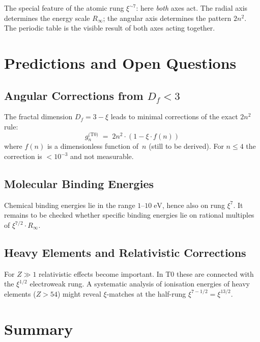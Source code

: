 \vspace{0.5em}

The special feature of the atomic rung $\xi^{\sim 7}$: here \emph{both} axes
act. The radial axis determines the energy scale $R_\infty$; the angular axis
determines the pattern $2n^2$. The periodic table is the visible result of
both axes acting together.

\section{Predictions and Open Questions}
\label{sec:predictions}

\subsection{Angular Corrections from \texorpdfstring{$D_f < 3$}{Df<3}}

The fractal dimension $D_f = 3 - \xi$ leads to minimal corrections of the
exact $2n^2$ rule:
\begin{equation}
  g_n^\text{(T0)} \;=\; 2n^2 \cdot (1 - \xi \cdot f(n))
\end{equation}
where $f(n)$ is a dimensionless function of~$n$ (still to be derived).
For $n \leq 4$ the correction is $< 10^{-3}$ and not measurable.

\subsection{Molecular Binding Energies}

Chemical binding energies lie in the range $1$–$10\;\text{eV}$, hence also
on rung $\xi^7$. It remains to be checked whether specific binding energies
lie on rational multiples of $\xi^{7/2} \cdot R_\infty$.

\subsection{Heavy Elements and Relativistic Corrections}

For $Z \gg 1$ relativistic effects become important. In T0 these are connected
with the $\xi^{1/2}$ electroweak rung. A systematic analysis of ionisation
energies of heavy elements ($Z > 54$) might reveal $\xi$-matches at the
half-rung $\xi^{7-1/2} = \xi^{13/2}$.

\section{Summary}
\label{sec:summary}

